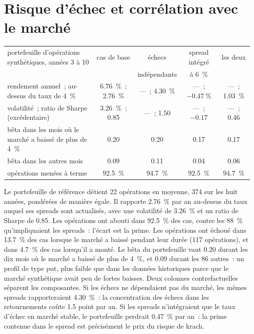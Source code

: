 \section{Risque d'échec et corrélation avec le marché}

\begin{center}
\small
\setlength{\tabcolsep}{4pt}%
\begin{tabular}{@{}p{5.4cm}cccc@{}}
\toprule
portefeuille d'opérations synthétiques, années 3 à 10 & cas de base & échecs & spread intégré & les deux\\
 & & indépendants & à 6~\% & \\
\midrule
rendement annuel~; au-dessus du taux de 4~\% & 6.76~\%~; 2.76~\% & ---~; 4.30~\% & ---~; $-0.47~\%$ & ---~; 1.03~\%\\
volatilité~; ratio de Sharpe (excédentaire) & 3.26~\%~; 0.85 & ---~; 1.50 & ---~; $-0.17$ & ---~; 0.46\\
bêta dans les mois où le marché a baissé de plus de 4~\% & 0.20 & 0.20 & 0.17 & 0.17\\
bêta dans les autres mois & 0.09 & 0.11 & 0.04 & 0.06\\
opérations menées à terme & 92.5~\% & 94.7~\% & 92.5~\% & 94.7~\%\\
\bottomrule
\end{tabular}
\end{center}

Le portefeuille de référence détient 22 opérations en moyenne, 374 sur les huit années, pondérées de manière égale. Il rapporte 2.76~\% par an au-dessus du taux auquel ses spreads sont actualisés,
avec une volatilité de 3.26~\% et un ratio de Sharpe de 0.85. Les opérations ont abouti dans 92.5~\% des cas, contre les 88~\% qu'impliquaient les spreads~: l'écart est la prime. Les opérations
ont échoué dans 13.7~\% des cas lorsque le marché a baissé pendant leur durée (117 opérations), et dans 4.7~\% des cas lorsqu'il a monté. Le bêta du portefeuille vaut 0.20 durant les dix mois où le
marché a baissé de plus de 4~\%, et 0.09 durant les 86 autres~: un profil de type put, plus faible que dans les données historiques parce que le marché synthétique avait peu de
fortes baisses. Deux colonnes contrefactuelles séparent les composantes. Si les échecs ne dépendaient pas du marché, les mêmes spreads rapporteraient 4.30~\%~: la concentration des échecs
dans les retournements coûte 1.5 point par an. Si les spreads n'intégraient que le taux d'échec en marché stable, le portefeuille perdrait 0.47~\% par an~: la prime
contenue dans le spread est précisément le prix du risque de krach.

